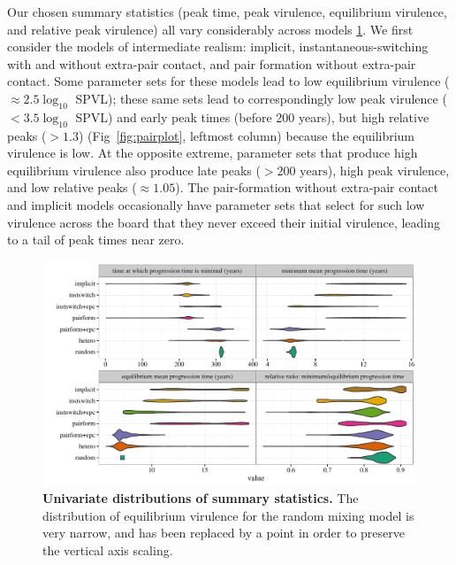 \documentclass[10pt,letterpaper]{article}
\renewcommand{\figurename}{Fig}
\begin{document}
Our chosen summary statistics (peak time, peak virulence, equilibrium
virulence, and relative peak virulence) all vary considerably across models
\ref{fig:unidist}.
We first consider the models of intermediate realism: implicit,
instantaneous-switching with and without extra-pair contact, and
pair formation without extra-pair contact. Some parameter
sets for these models lead to low equilibrium virulence ($\approx 2.5 \log_{10}$ SPVL);
these same sets lead to correspondingly low
peak virulence ($< 3.5 \log_{10}$ SPVL) and early peak times (before 200 years), 
but high relative peaks ($>1.3$)
(\figurename~\ref{fig:pairplot}, leftmost column) because the equilibrium virulence is low.
At the opposite extreme, parameter sets that produce high equilibrium virulence 
also produce late peaks ($> 200 \text{ years}$), 
high peak virulence, and low relative peaks ($\approx 1.05$).
The pair-formation without extra-pair contact and implicit models
occasionally have parameter sets that select for such low virulence across
the board that they never exceed their initial virulence, leading to a tail
of peak times near zero.

\begin{figure}[!ht]
\includegraphics[width=\textwidth]{../figures/fig3.pdf}
\caption{{\bf Univariate distributions of summary statistics.}
The distribution of equilibrium virulence for the random mixing model is very narrow, and has been replaced by a point in order to preserve the vertical axis scaling.}
\label{fig:unidist}
\end{figure}
\end{document}
